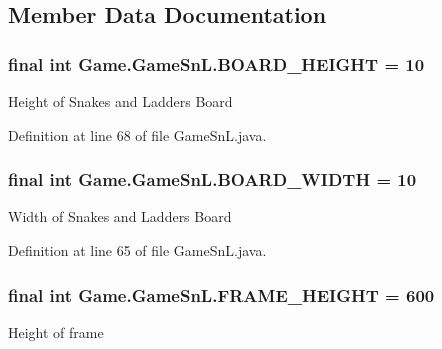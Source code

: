 \subsection{Member Data Documentation}
\hypertarget{class_game_1_1_game_sn_l_a1fe9384816bed631e283ad665da87b25}{}
\subsubsection[{B\+O\+A\+R\+D\+\_\+\+H\+E\+I\+G\+H\+T}]{\setlength{\rightskip}{0pt plus 5cm}final int Game.\+Game\+Sn\+L.\+B\+O\+A\+R\+D\+\_\+\+H\+E\+I\+G\+H\+T = 10\hspace{0.3cm}{\ttfamily [private]}}\label{class_game_1_1_game_sn_l_a1fe9384816bed631e283ad665da87b25}
Height of Snakes and Ladders Board 

Definition at line 68 of file Game\+Sn\+L.\+java.

\hypertarget{class_game_1_1_game_sn_l_ad8871bbe0cb946186f76093b958380b2}{}
\subsubsection[{B\+O\+A\+R\+D\+\_\+\+W\+I\+D\+T\+H}]{\setlength{\rightskip}{0pt plus 5cm}final int Game.\+Game\+Sn\+L.\+B\+O\+A\+R\+D\+\_\+\+W\+I\+D\+T\+H = 10\hspace{0.3cm}{\ttfamily [private]}}\label{class_game_1_1_game_sn_l_ad8871bbe0cb946186f76093b958380b2}
Width of Snakes and Ladders Board 

Definition at line 65 of file Game\+Sn\+L.\+java.

\hypertarget{class_game_1_1_game_sn_l_a624c7a8a2f8d296257239b8003a5dafd}{}
\subsubsection[{F\+R\+A\+M\+E\+\_\+\+H\+E\+I\+G\+H\+T}]{\setlength{\rightskip}{0pt plus 5cm}final int Game.\+Game\+Sn\+L.\+F\+R\+A\+M\+E\+\_\+\+H\+E\+I\+G\+H\+T = 600\hspace{0.3cm}{\ttfamily [private]}}\label{class_game_1_1_game_sn_l_a624c7a8a2f8d296257239b8003a5dafd}
Height of frame 

